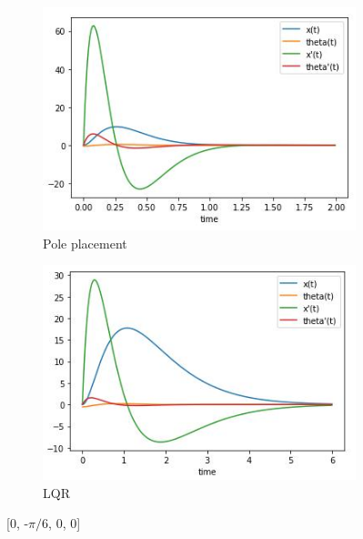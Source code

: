 \documentclass[12pt,letterpaper]{article}
\begin{document}
    \begin{figure}[htb]
        \begin{subfigure}{.5\textwidth}
            \centering
            \includegraphics[width=1\linewidth]{images/output/poles/0-neg_pi_6-0-0.jpg}
            \caption{Pole placement}
            \label{fig:pole_2}
        \end{subfigure}
        \begin{subfigure}{.5\textwidth}
          \centering
          \includegraphics[width=1\linewidth]{images/output/0-neg_pi_6-0-0.jpg}
          \caption{LQR}
        \label{fig:lqr_2}
        \end{subfigure}
    \caption{[0, -$\pi / 6$, 0, 0]}
    \end{figure}
    
\end{document}

